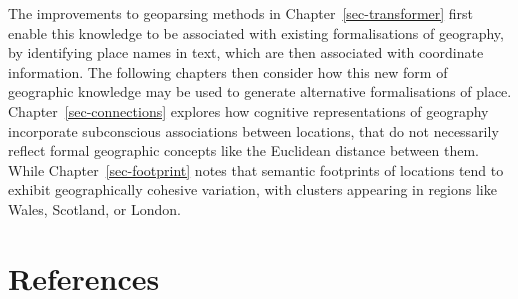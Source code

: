 \documentclass[
  letterpaper,
  11pt,
  english,
  onehalfspacing,
  headsepline]{MastersDoctoralThesis}
\begin{document}
The improvements to geoparsing methods in Chapter~\ref{sec-transformer}
first enable this knowledge to be associated with existing
formalisations of geography, by identifying place names in text, which
are then associated with coordinate information. The following chapters
then consider how this new form of geographic knowledge may be used to
generate alternative formalisations of place.
Chapter~\ref{sec-connections} explores how cognitive representations of
geography incorporate subconscious associations between locations, that
do not necessarily reflect formal geographic concepts like the Euclidean
distance between them. While Chapter~\ref{sec-footprint} notes that
semantic footprints of locations tend to exhibit geographically cohesive
variation, with clusters appearing in regions like Wales, Scotland, or
London.


\hypertarget{references}{%
\chapter*{References}\label{references}}

\end{document}
